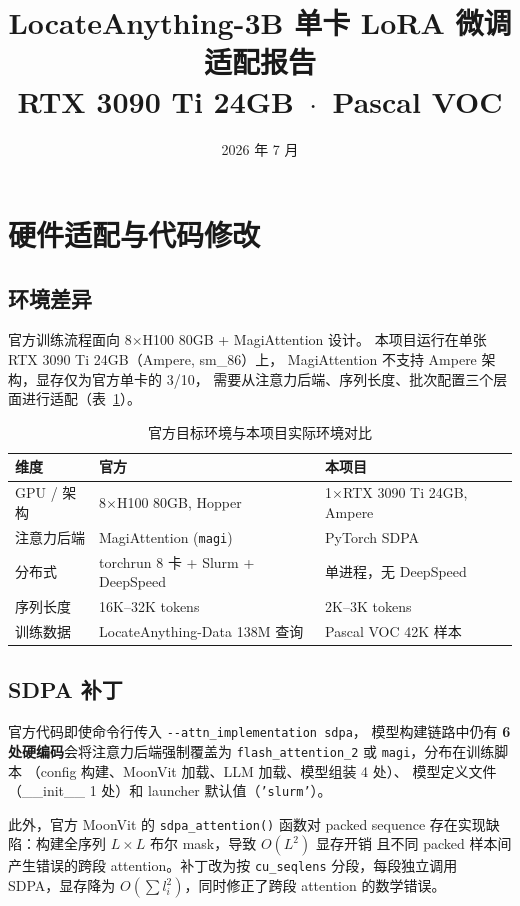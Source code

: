 \documentclass[11pt,a4paper]{article}
\title{\Large\bfseries
LocateAnything-3B 单卡 LoRA 微调适配报告\\[4pt]
\normalsize\mdseries RTX 3090 Ti 24GB \,$\cdot$\, Pascal VOC}
\author{}
\date{2026 年 7 月}
\begin{document}
\maketitle


\section{硬件适配与代码修改}

\subsection{环境差异}

官方训练流程面向 8$\times$H100 80GB + MagiAttention 设计。
本项目运行在单张 RTX 3090 Ti 24GB（Ampere, sm\_86）上，
MagiAttention 不支持 Ampere 架构，显存仅为官方单卡的 3/10，
需要从注意力后端、序列长度、批次配置三个层面进行适配（表~\ref{tab:hw}）。

\begin{table}[H]
\centering\small
\caption{官方目标环境与本项目实际环境对比}\label{tab:hw}
\begin{tabularx}{\textwidth}{lXX}
\toprule
\textbf{维度} & \textbf{官方} & \textbf{本项目} \\
\midrule
GPU / 架构  & 8$\times$H100 80GB, Hopper & 1$\times$RTX 3090 Ti 24GB, Ampere \\
注意力后端  & MagiAttention (\texttt{magi}) & PyTorch SDPA \\
分布式      & torchrun 8 卡 + Slurm + DeepSpeed & 单进程，无 DeepSpeed \\
序列长度    & 16K--32K tokens & 2K--3K tokens \\
训练数据    & LocateAnything-Data 138M 查询 & Pascal VOC 42K 样本 \\
\bottomrule
\end{tabularx}
\end{table}

\subsection{SDPA 补丁}

官方代码即使命令行传入 \texttt{-{}-attn\_implementation sdpa}，
模型构建链路中仍有 \textbf{6 处硬编码}会将注意力后端强制覆盖为
\texttt{flash\_attention\_2} 或 \texttt{magi}，分布在训练脚本
（config 构建、MoonVit 加载、LLM 加载、模型组装 4 处）、
模型定义文件（\_\_init\_\_ 1 处）和 launcher 默认值（\texttt{'slurm'}）。

此外，官方 MoonVit 的 \texttt{sdpa\_attention()} 函数对 packed sequence
存在实现缺陷：构建全序列 $L \times L$ 布尔 mask，导致 $O(L^2)$ 显存开销
且不同 packed 样本间产生错误的跨段 attention。补丁改为按
\texttt{cu\_seqlens} 分段，每段独立调用 SDPA，显存降为
$O(\sum l_i^2)$，同时修正了跨段 attention 的数学错误。
\end{document}
